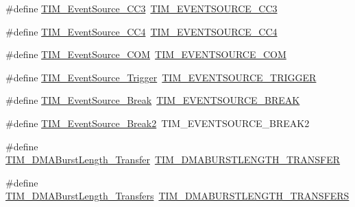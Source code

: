 \begin{DoxyCompactItemize}
\item 
\#define \hyperlink{group___h_a_l___t_i_m___aliased___defines_gafeb8538e3b00d938e061e5051f83836b}{T\+I\+M\+\_\+\+Event\+Source\+\_\+\+C\+C3}~\hyperlink{group___t_i_m___event___source_ga1c2faf942ab525b44299ddd0a6d848e4}{T\+I\+M\+\_\+\+E\+V\+E\+N\+T\+S\+O\+U\+R\+C\+E\+\_\+\+C\+C3}
\item 
\#define \hyperlink{group___h_a_l___t_i_m___aliased___defines_gab60e3190e6c09d2d067f2c689d614979}{T\+I\+M\+\_\+\+Event\+Source\+\_\+\+C\+C4}~\hyperlink{group___t_i_m___event___source_ga157e43c99e6a1c0097b184cc842b5dfb}{T\+I\+M\+\_\+\+E\+V\+E\+N\+T\+S\+O\+U\+R\+C\+E\+\_\+\+C\+C4}
\item 
\#define \hyperlink{group___h_a_l___t_i_m___aliased___defines_ga4c06981037fae91786f966aa9b4b3435}{T\+I\+M\+\_\+\+Event\+Source\+\_\+\+C\+OM}~\hyperlink{group___t_i_m___event___source_ga5724ce4aaf842a2166edaaff1531c1d1}{T\+I\+M\+\_\+\+E\+V\+E\+N\+T\+S\+O\+U\+R\+C\+E\+\_\+\+C\+OM}
\item 
\#define \hyperlink{group___h_a_l___t_i_m___aliased___defines_ga24835bf5eac25eed90069208dce22564}{T\+I\+M\+\_\+\+Event\+Source\+\_\+\+Trigger}~\hyperlink{group___t_i_m___event___source_ga85573ed76442490db67e4b759fe6d901}{T\+I\+M\+\_\+\+E\+V\+E\+N\+T\+S\+O\+U\+R\+C\+E\+\_\+\+T\+R\+I\+G\+G\+ER}
\item 
\#define \hyperlink{group___h_a_l___t_i_m___aliased___defines_gad6f9b5366d93c73ff005273c50c9f00a}{T\+I\+M\+\_\+\+Event\+Source\+\_\+\+Break}~\hyperlink{group___t_i_m___event___source_ga83d16368fe3172a98c41d7c414780a64}{T\+I\+M\+\_\+\+E\+V\+E\+N\+T\+S\+O\+U\+R\+C\+E\+\_\+\+B\+R\+E\+AK}
\item 
\#define \hyperlink{group___h_a_l___t_i_m___aliased___defines_ga18fcfb87d3361c3118e7251d5a99b92a}{T\+I\+M\+\_\+\+Event\+Source\+\_\+\+Break2}~T\+I\+M\+\_\+\+E\+V\+E\+N\+T\+S\+O\+U\+R\+C\+E\+\_\+\+B\+R\+E\+A\+K2
\item 
\#define \hyperlink{group___h_a_l___t_i_m___aliased___defines_gab87f91f1c5583b9888cb6bb37fc639e2}{T\+I\+M\+\_\+\+D\+M\+A\+Burst\+Length\+\_\+Transfer}~\hyperlink{group___t_i_m___d_m_a___burst___length_ga74f07b4a10022d71f31ec6e1b2b69276}{T\+I\+M\+\_\+\+D\+M\+A\+B\+U\+R\+S\+T\+L\+E\+N\+G\+T\+H\+\_\+T\+R\+A\+N\+S\+F\+ER}
\item 
\#define \hyperlink{group___h_a_l___t_i_m___aliased___defines_ga829504c3e8c90a9445f6a223bc3034f8}{T\+I\+M\+\_\+\+D\+M\+A\+Burst\+Length\+\_\+Transfers}~\hyperlink{group___t_i_m___d_m_a___burst___length_gab114592091a00e0a6b9ae464485bd7bb}{T\+I\+M\+\_\+\+D\+M\+A\+B\+U\+R\+S\+T\+L\+E\+N\+G\+T\+H\+\_\+T\+R\+A\+N\+S\+F\+E\+RS}

\end{DoxyCompactItemize}
